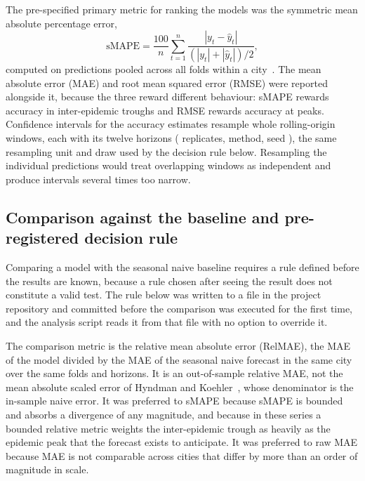 \documentclass[10pt,letterpaper]{article}
\begin{document}
The pre-specified primary metric for ranking the models was the symmetric mean absolute percentage error,
\[
\mathrm{sMAPE} = \frac{100}{n}\sum_{t=1}^{n}\frac{|y_t - \hat{y}_t|}{(|y_t| + |\hat{y}_t|)/2},
\]
computed on predictions pooled across all folds within a city~\cite{Hewamalage2023}. The mean absolute error (MAE) and root mean squared error (RMSE) were reported alongside it, because the three reward different behaviour: sMAPE rewards accuracy in inter-epidemic troughs and RMSE rewards accuracy at peaks. Confidence intervals for the accuracy estimates resample whole rolling-origin windows, each with its twelve horizons ( replicates,  method, seed ), the same resampling unit and draw used by the decision rule below. Resampling the individual predictions would treat overlapping windows as independent and produce intervals several times too narrow.

\subsection*{Comparison against the baseline and pre-registered decision rule}

Comparing a model with the seasonal naive baseline requires a rule defined before the results are known, because a rule chosen after seeing the result does not constitute a valid test. The rule below was written to a file in the project repository and committed before the comparison was executed for the first time, and the analysis script reads it from that file with no option to override it.

The comparison metric is the relative mean absolute error (RelMAE), the MAE of the model divided by the MAE of the seasonal naive forecast in the same city over the same folds and horizons. It is an out-of-sample relative MAE, not the mean absolute scaled error of Hyndman and Koehler~\cite{Hyndman2006}, whose denominator is the in-sample naive error. It was preferred to sMAPE because sMAPE is bounded and absorbs a divergence of any magnitude, and because in these series a bounded relative metric weights the inter-epidemic trough as heavily as the epidemic peak that the forecast exists to anticipate. It was preferred to raw MAE because MAE is not comparable across cities that differ by more than an order of magnitude in scale.
\end{document}
